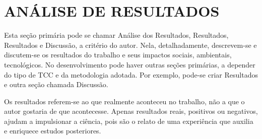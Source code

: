 \chapter{ANÁLISE DE RESULTADOS }\label{chp:AnaliseResultados}

Esta seção primária pode se chamar Análise dos Resultados, Resultados, Resultados e Discussão, a critério do autor. Nela, detalhadamente, descrevem-se e discutem-se os resultados do trabalho e seus impactos sociais, ambientais, tecnológicos. No desenvolvimento pode haver outras seções primárias, a depender do tipo de TCC e da metodologia adotada. Por exemplo, pode-se criar Resultados e outra seção chamada Discussão. 

Os resultados referem-se ao que realmente aconteceu no trabalho, não a que o autor gostaria de que acontecesse. Apenas resultados reais, positivos ou negativos, ajudam a impulsionar a ciência, pois são o relato de uma experiência que auxilia e enriquece estudos posteriores.
